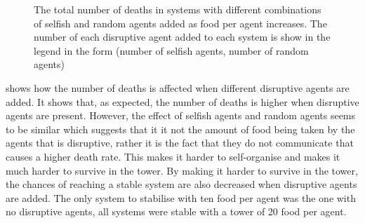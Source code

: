 \begin{figure}[H] %
    \centering
    \caption{The total number of deaths in systems with different combinations of selfish and random agents added as food per agent increases. The number of each disruptive agent added to each system is show in the legend in the form (number of selfish agents, number of random agents)}
    \label{fig:team1-robustness-food-scarcity-disruptive-agents}
\end{figure}

 shows how the number of deaths is affected when different disruptive agents are added. It shows that, as expected, the number of deaths is higher when disruptive agents are present. However, the effect of selfish agents and random agents seems to be similar which suggests that it it not the amount of food being taken by the agents that is disruptive, rather it is the fact that they do not communicate that causes a higher death rate. This makes it harder to self-organise and makes it much harder to survive in the tower. 
By making it harder to survive in the tower, the chances of reaching a stable system are also decreased when disruptive agents are added. The only system to stabilise with ten food per agent was the one with no disruptive agents, all systems were stable with a tower of 20 food per agent.
